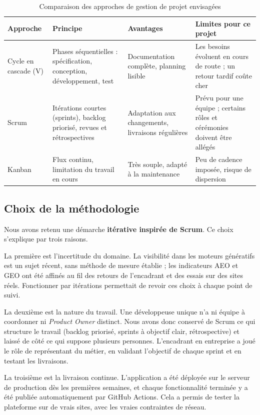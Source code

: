 \begin{table}[htbp]
\centering
\small
\caption{Comparaison des approches de gestion de projet envisagées}\label{tab-methodologies}
\begin{tabularx}{\textwidth}{@{}lXXX@{}}
\toprule
\textbf{Approche} & \textbf{Principe} & \textbf{Avantages} & \textbf{Limites pour ce projet}\\
\midrule
Cycle en cascade (V) & Phases séquentielles : spécification, conception, développement, test & Documentation complète, planning lisible & Les besoins évoluent en cours de route ; un retour tardif coûte cher\\
Scrum & Itérations courtes (sprints), backlog priorisé, revues et rétrospectives \cite{scrumguide} & Adaptation aux changements, livraisons régulières & Prévu pour une équipe ; certains rôles et cérémonies doivent être allégés\\
Kanban & Flux continu, limitation du travail en cours \cite{anderson2010kanban} & Très souple, adapté à la maintenance & Peu de cadence imposée, risque de dispersion\\
\bottomrule
\end{tabularx}
\end{table}

\subsection{Choix de la méthodologie}
Nous avons retenu une démarche \textbf{itérative inspirée de Scrum}. Ce choix s'explique par trois raisons.

La première est l'incertitude du domaine. La visibilité dans les moteurs génératifs est un sujet récent, sans méthode de mesure établie ; les indicateurs AEO et GEO ont été affinés au fil des retours de l'encadrant et des essais sur des sites réels. Fonctionner par itérations permettait de revoir ces choix à chaque point de suivi.

La deuxième est la nature du travail. Une développeuse unique n'a ni équipe à coordonner ni \textit{Product Owner} distinct. Nous avons donc conservé de Scrum ce qui structure le travail (backlog priorisé, sprints à objectif clair, rétrospective) et laissé de côté ce qui suppose plusieurs personnes. L'encadrant en entreprise a joué le rôle de représentant du métier, en validant l'objectif de chaque sprint et en testant les livraisons.

La troisième est la livraison continue. L'application a été déployée sur le serveur de production dès les premières semaines, et chaque fonctionnalité terminée y a été publiée automatiquement par GitHub Actions. Cela a permis de tester la plateforme sur de vrais sites, avec les vraies contraintes de réseau.

